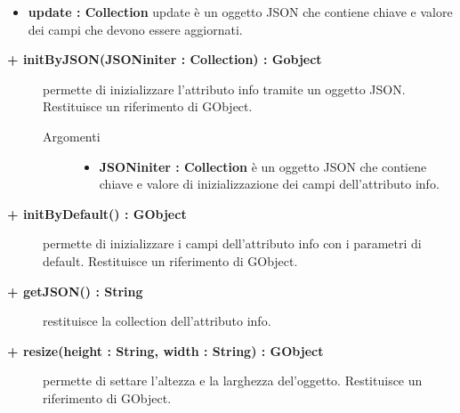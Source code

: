 \begin{description}
\begin{description}
\begin{description}
\begin{itemize}
					\item \textbf{update : Collection			} \hfill
					update è un oggetto JSON che contiene chiave e valore dei campi che devono essere aggiornati. 
				\end{itemize}
		\end{description}

\end{description}

\begin{description}
		\item[\textbf{\color{blue}+ initByJSON(JSONiniter : Collection) : Gobject			}] \hfill
			permette di inizializzare l'attributo info tramite un oggetto JSON. Restituisce un riferimento di GObject. 
			
		\begin{description}
			\item[Argomenti] \hfill
				\begin{itemize}
				
					\item \textbf{JSONiniter : Collection			} \hfill
					è un oggetto JSON che contiene chiave e valore di inizializzazione dei campi dell'attributo info. 
				\end{itemize}
		\end{description}

\end{description}

\begin{description}
		\item[\textbf{\color{blue}+ initByDefault() : GObject			}] \hfill
			permette di inizializzare i campi dell'attributo info con i parametri di default. Restituisce un riferimento di GObject.

\end{description}

\begin{description}
		\item[\textbf{\color{blue}+ getJSON() : String			}] \hfill
			restituisce la collection dell'attributo info.

\end{description}

\begin{description}
		\item[\textbf{\color{blue}+ resize(height : String, width : String) : GObject			}] \hfill
			permette di settare l'altezza e la larghezza del'oggetto. Restituisce un riferimento di GObject.
			

\end{description}
\end{description}
